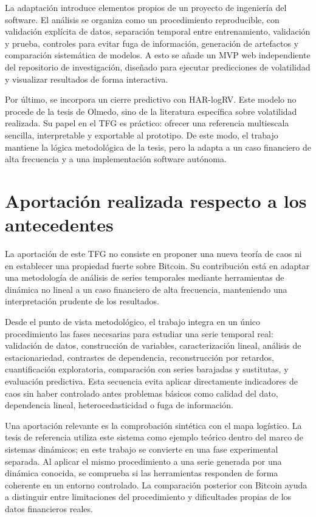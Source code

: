 La adaptación introduce elementos propios de un proyecto de ingeniería del software. El análisis se organiza como un procedimiento reproducible, con validación explícita de datos, separación temporal entre entrenamiento, validación y prueba, controles para evitar fuga de información, generación de artefactos y comparación sistemática de modelos. A esto se añade un MVP web independiente del repositorio de investigación, diseñado para ejecutar predicciones de volatilidad y visualizar resultados de forma interactiva.

Por último, se incorpora un cierre predictivo con HAR-logRV. Este modelo no procede de la tesis de Olmedo, sino de la literatura específica sobre volatilidad realizada. Su papel en el TFG es práctico: ofrecer una referencia multiescala sencilla, interpretable y exportable al prototipo. De este modo, el trabajo mantiene la lógica metodológica de la tesis, pero la adapta a un caso financiero de alta frecuencia y a una implementación software autónoma.

\section{Aportación realizada respecto a los antecedentes}\label{sec:aportacion-antecedentes}

La aportación de este TFG no consiste en proponer una nueva teoría de caos ni en establecer una propiedad fuerte sobre Bitcoin. Su contribución está en adaptar una metodología de análisis de series temporales mediante herramientas de dinámica no lineal a un caso financiero de alta frecuencia, manteniendo una interpretación prudente de los resultados.

Desde el punto de vista metodológico, el trabajo integra en un único procedimiento las fases necesarias para estudiar una serie temporal real: validación de datos, construcción de variables, caracterización lineal, análisis de estacionariedad, contrastes de dependencia, reconstrucción por retardos, cuantificación exploratoria, comparación con series barajadas y sustitutas, y evaluación predictiva. Esta secuencia evita aplicar directamente indicadores de caos sin haber controlado antes problemas básicos como calidad del dato, dependencia lineal, heterocedasticidad o fuga de información.

Una aportación relevante es la comprobación sintética con el mapa logístico. La tesis de referencia utiliza este sistema como ejemplo teórico dentro del marco de sistemas dinámicos; en este trabajo se convierte en una fase experimental separada. Al aplicar el mismo procedimiento a una serie generada por una dinámica conocida, se comprueba si las herramientas responden de forma coherente en un entorno controlado. La comparación posterior con Bitcoin ayuda a distinguir entre limitaciones del procedimiento y dificultades propias de los datos financieros reales.

